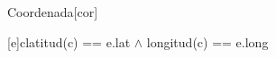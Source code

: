 \begin{Representacion}


	\begin{Estructura}{Coordenada}[cor]
		\begin{Tupla}[cor]
		\end{Tupla}

	\end{Estructura}





	{c}{latitud(c) == e.lat $\land$ longitud(c) == e.long}

\end{Representacion}


